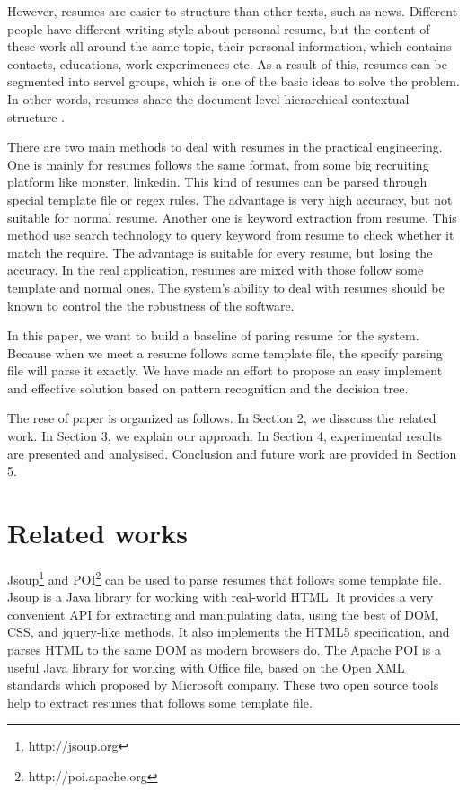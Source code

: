 \documentclass{acm_proc_article-sp}
\begin{document}
However, resumes are easier to structure than other texts, such as news. 
Different people have different writing style about personal resume, but the content of these work all around the same topic, their personal information, which contains contacts, educations, work experimences etc.
As a result of this, resumes can be segmented into servel groups, which is one of the basic ideas to solve the problem.
In other words, resumes share the document-level hierarchical contextual structure \cite{maheshwari2010approach}.

There are two main methods to deal with resumes in the practical engineering. 
One is mainly for resumes follows the same format, from some big recruiting platform like monster, linkedin.
This kind of resumes can be parsed through special template file or regex rules.
The advantage is very high accuracy, but not suitable for normal resume.
Another one is keyword extraction from resume.
This method use search technology to query keyword from resume to check whether it match the require.
The advantage is suitable for every resume, but losing the accuracy.
In the real application, resumes are mixed with those follow some template and normal ones.
The system's ability to deal with resumes should be known to control the the robustness of the software.

In this paper, we want to build a baseline of paring resume for the system. 
Because when we meet a resume follows some template file, the specify parsing file will parse it exactly. 
We have made an effort to propose an easy implement and effective solution based on pattern recognition and the decision tree.

The rese of paper is organized as follows. In Section 2, we disscuss the related work. In Section 3, we explain our approach. In Section 4, experimental results are presented and analysised. Conclusion and future work are provided in Section 5.

\section{Related works}

Jsoup\footnote{http://jsoup.org} and POI\footnote{http://poi.apache.org} can be used to parse resumes that follows some template file.
Jsoup is a Java library for working with real-world HTML. 
It provides a very convenient API for extracting and manipulating data, using the best of DOM, CSS, and jquery-like methods.
It also implements the HTML5 specification, and parses HTML to the same DOM as modern browsers do.
The Apache POI is a useful Java library for working with Office file, based on the Open XML standards which proposed by Microsoft company.
These two open source tools help to extract resumes that follows some template file.
\end{document}
